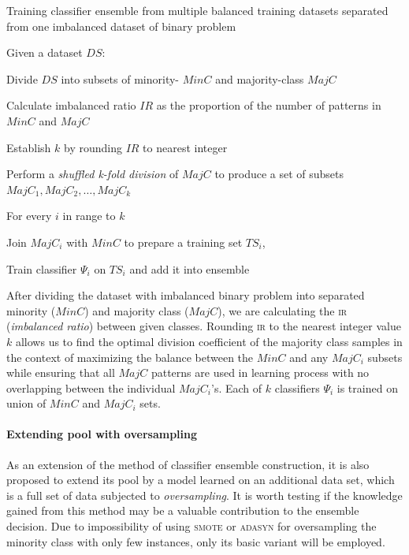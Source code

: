 \documentclass[pmlr]{jmlr}
\begin{document}
\begin{algorithm}[!h]
\caption{Training classifier ensemble from multiple balanced training datasets separated from one imbalanced dataset of binary problem}\label{alg:moore}
Given a dataset $DS$:
\begin{enumerate*}
	\item Divide $DS$ into subsets of minority- $MinC$ and majority-class $MajC$
	\item Calculate imbalanced ratio $IR$ as the proportion of the number of patterns in $MinC$ and $MajC$ 
	\item Establish $k$ by rounding $IR$ to nearest integer
	\item Perform a \emph{shuffled k-fold division} of $MajC$ to produce a set of subsets $MajC_1, MajC_2, \ldots, MajC_k$ 
	\item For every $i$ in range to $k$
	\begin{enumerate*}
		\item Join $MajC_i$ with $MinC$ to prepare a training set $TS_i$,
		\item Train classifier $\Psi_i$ on $TS_i$ and add it into ensemble
	\end{enumerate*}
\end{enumerate*}
\end{algorithm}

After dividing the dataset with imbalanced binary problem into separated minority ($MinC$) and majority class ($MajC$), we are calculating the \textsc{ir} (\emph{imbalanced ratio}) between given classes. Rounding \textsc{ir} to the nearest integer value $k$ allows us to find the optimal division coefficient of the majority class samples in the context of maximizing the balance between the $MinC$ and any $MajC_i$ subsets while ensuring that all $MajC$ patterns are used in learning process with no overlapping between the individual $MajC_i$'s. Each of $k$ classifiers $\Psi_i$ is trained on union of $MinC$ and $MajC_i$ sets.

\paragraph{Extending pool with oversampling} As an extension of the method of classifier ensemble construction, it is also proposed to extend its pool by a model learned on an additional data set, which is a full set of data subjected to \emph{oversampling}. It is worth testing if the knowledge gained from this method may be a valuable contribution to the ensemble decision. Due to impossibility of using \textsc{smote} or \textsc{adasyn} for oversampling the minority class with only few instances, only its basic variant will be employed. 
\end{document}
